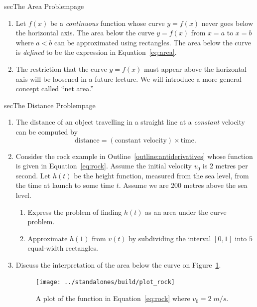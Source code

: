 \documentclass[../main]{subfiles}
\begin{document}
\begin{outline}{sec}{The Area Problem}{page}
\begin{enumerate}
    \item {Let \(f(x)\) be a \emph{continuous} function whose curve \(y = f(x)\) never goes below the horizontal axis. The area below the curve \(y = f(x)\) from \(x=a\) to \(x=b\) where \(a < b\) can be approximated using rectangles. The area below the curve is \emph{defined} to be the expression in Equation~\eqref{eq:area}.}
    \item {The restriction that the curve \(y = f(x)\) must appear above the horizontal axis will be loosened in a future lecture. We will introduce a more general concept called ``net area.''}
  \end{enumerate}

\end{outline}



\begin{outline}{sec}{The Distance Problem}{page} \label{outline:distance}
  \begin{enumerate}
    \item The distance of an object travelling in a straight line at a \emph{constant} velocity can be computed by
      \[
        \text{distance} = (\text{constant velocity}) \times \text{time}.
      \]

    \item Consider the rock example in Outline~\ref{outline:antiderivatives} whose function is given in Equation~\eqref{eq:rock}. Assume the initial velocity \(v_{0}\) is \(2\) metres per second. Let \(h(t)\) be the height function, measured from the sea level, from the time at launch to some time \(t\). Assume we are 200 metres above the sea level.
      \begin{enumerate}
        \item Express the problem of finding \(h(t)\) as an area under the curve problem.
        \item Approximate \(h(1)\) from \(v(t)\) by subdividing the interval \([0,1]\) into \(5\) equal-width rectangles.
      \end{enumerate}

    \item Discuss the interpretation of the area below the curve on Figure~\ref{fig:rock}. 
      \begin{figure}[h!]  %
        \centering
        \texttt{[image: ../standalones/build/plot\_rock]}
        \caption{A plot of the function in Equation~\eqref{eq:rock} where \(v_{0} = 2\;m/s\).}
        \label{fig:rock}
      \end{figure}
  \end{enumerate}
\end{outline}
\end{document}
